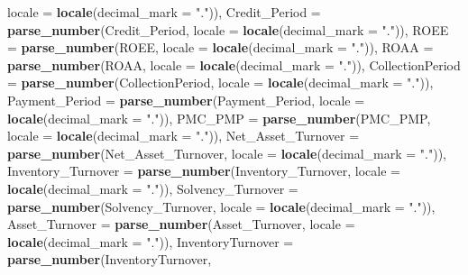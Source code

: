 \documentclass[
]{article}
\newenvironment{Shaded}{\begin{snugshade}}{\end{snugshade}}
\newcommand{\AttributeTok}[1]{\textcolor[rgb]{0.13,0.29,0.53}{#1}}
\newcommand{\FunctionTok}[1]{\textcolor[rgb]{0.13,0.29,0.53}{\textbf{#1}}}
\newcommand{\NormalTok}[1]{#1}
\newcommand{\StringTok}[1]{\textcolor[rgb]{0.31,0.60,0.02}{#1}}
\begin{document}
\begin{Shaded}
\begin{Highlighting}[]
                                     \AttributeTok{locale =} \FunctionTok{locale}\NormalTok{(}\AttributeTok{decimal\_mark =} \StringTok{"."}\NormalTok{)),}
    \AttributeTok{Credit\_Period =} \FunctionTok{parse\_number}\NormalTok{(Credit\_Period, }
                                 \AttributeTok{locale =} \FunctionTok{locale}\NormalTok{(}\AttributeTok{decimal\_mark =} \StringTok{"."}\NormalTok{)),}
    \AttributeTok{ROEE =} \FunctionTok{parse\_number}\NormalTok{(ROEE, }\AttributeTok{locale =} 
                          \FunctionTok{locale}\NormalTok{(}\AttributeTok{decimal\_mark =} \StringTok{"."}\NormalTok{)),}
    \AttributeTok{ROAA =} \FunctionTok{parse\_number}\NormalTok{(ROAA, }
                        \AttributeTok{locale =} \FunctionTok{locale}\NormalTok{(}\AttributeTok{decimal\_mark =} \StringTok{"."}\NormalTok{)),}
    \AttributeTok{CollectionPeriod =} \FunctionTok{parse\_number}\NormalTok{(CollectionPeriod, }
                                    \AttributeTok{locale =} \FunctionTok{locale}\NormalTok{(}\AttributeTok{decimal\_mark =} \StringTok{"."}\NormalTok{)),}
    \AttributeTok{Payment\_Period =} \FunctionTok{parse\_number}\NormalTok{(Payment\_Period, }
                                  \AttributeTok{locale =} \FunctionTok{locale}\NormalTok{(}\AttributeTok{decimal\_mark =} \StringTok{"."}\NormalTok{)),}
    \AttributeTok{PMC\_PMP =} \FunctionTok{parse\_number}\NormalTok{(PMC\_PMP, }
                           \AttributeTok{locale =} \FunctionTok{locale}\NormalTok{(}\AttributeTok{decimal\_mark =} \StringTok{"."}\NormalTok{)),}
    \AttributeTok{Net\_Asset\_Turnover =} \FunctionTok{parse\_number}\NormalTok{(Net\_Asset\_Turnover, }
                                      \AttributeTok{locale =} \FunctionTok{locale}\NormalTok{(}\AttributeTok{decimal\_mark =} \StringTok{"."}\NormalTok{)),}
    \AttributeTok{Inventory\_Turnover =} \FunctionTok{parse\_number}\NormalTok{(Inventory\_Turnover, }
                                      \AttributeTok{locale =} \FunctionTok{locale}\NormalTok{(}\AttributeTok{decimal\_mark =} \StringTok{"."}\NormalTok{)),}
    \AttributeTok{Solvency\_Turnover =} \FunctionTok{parse\_number}\NormalTok{(Solvency\_Turnover, }
                                     \AttributeTok{locale =} \FunctionTok{locale}\NormalTok{(}\AttributeTok{decimal\_mark =} \StringTok{"."}\NormalTok{)),}
    \AttributeTok{Asset\_Turnover =} \FunctionTok{parse\_number}\NormalTok{(Asset\_Turnover, }
                                  \AttributeTok{locale =} \FunctionTok{locale}\NormalTok{(}\AttributeTok{decimal\_mark =} \StringTok{"."}\NormalTok{)),}
    \AttributeTok{InventoryTurnover =} \FunctionTok{parse\_number}\NormalTok{(InventoryTurnover, }

\end{Highlighting}
\end{Shaded}
\end{document}
